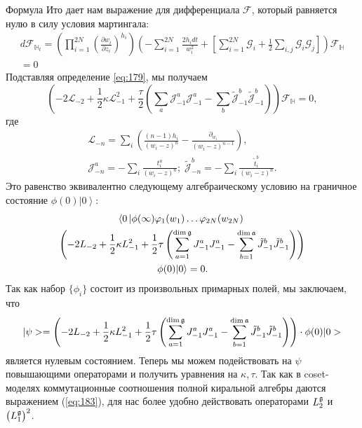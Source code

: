 Формула Ито дает нам выражение для дифференциала $\mathcal{F}$, который равняется нулю в силу условия мартингала:
\begin{multline}
d \mathcal{F}_{\mathbb{H}_{t}}= \left(\prod_{i=1}^{2N}\left(\frac{\partial w_{i}}{\partial z_{i}}\right)^{h_{i}}\right)
\left(-\sum_{i=1}^{2N}\frac{2h_{i}dt}{w_{i}^{2}}+\left[\sum_{i=1}^{2N}\mathcal{G}_{i}+\frac{1}{2}
      \sum_{i,j}\mathcal{G}_{i}\mathcal{G}_{j}\right]\right)\mathcal{F}_{\mathbb{H}}\\=0
\label{eq:180}
\end{multline}
Подставляя определение \eqref{eq:179}, мы получаем
\begin{equation}
  \left(-2 \mathcal{L}_{-2}+\frac{1}{2}\kappa \mathcal{L}_{-1}^{2}+\frac{\tau}{2}\left( \sum_{a} \mathcal{J}^{a}_{-1} \mathcal{J}^{a}_{-1}-
      \sum_{b}\tilde{\mathcal{J}}^{b}_{-1} \tilde{\mathcal{J}}^{b}_{-1}\right)\right)        \mathcal{F}_{\mathbb{H}}=0,
\label{eq:181}
\end{equation}
где
\begin{eqnarray*}
  \mathcal{L}_{-n}=\sum_{i}\left(\frac{(n-1)h_{i}}{(w_{i}-z)^{n}}-\frac{\partial_{w_{i}}}{(w_{i}-z)^{n-1}}\right),\\ \mathcal{J}^{a}_{{-n}}=-\sum_{i}\frac{t^{a}_{i}}{(w_{i}-z)^{n}};\; \tilde{\mathcal{J}}^{b}_{{-n}}=-\sum_{i}\frac{\tilde{t}^{b}_{i}}{(w_{i}-z)^{n}}.
\end{eqnarray*}
Это равенство эквивалентно следующему алгебраическому условию на граничное состояние $\phi(0)\left|0\right>$:
\begin{multline}
\label{eq:182}
  \left<0\left|\phi(\infty)\varphi_{1}(w_{1})\dots\varphi_{2N}(w_{2N})\right.\right.\\
  \left(-2L_{-2}+\frac{1}{2}\kappa L_{-1}^{2}+\frac{1}{2}\tau \left(\sum_{a=1}^{\dim\mathfrak{g}}J^{a}_{-1}J^{a}_{-1}-\sum_{b=1}^{\dim\mathfrak{a}}\tilde{J}^{b}_{-1}\tilde{J}^{b}_{-1}\right)\right)\\
\left.\phi(0)|0\right>=0.
\end{multline}
Так как набор  $\{\phi_{i}\}$ состоит из произвольных примарных полей, мы заключаем, что 
\begin{multline}
\label{eq:126}
|\psi>=\left(-2L_{-2}+\frac{1}{2}\kappa L_{-1}^{2}+\frac{1}{2}\tau \left(\sum_{a=1}^{\dim\mathfrak{g}}J^{a}_{-1}J^{a}_{-1}-\sum_{b=1}^{\dim\mathfrak{a}}\tilde{J}^{b}_{-1}\tilde{J}^{b}_{-1}\right)\right)
\cdot\phi(0)|0>
\end{multline}
является нулевым состоянием. Теперь мы можем подействовать на  $\psi$ повышающими операторами и получить уравнения на  $\kappa,\tau$. Так как в  coset-моделях коммутационные соотношения полной киральной алгебры даются выражением (\ref{eq:183}), для нас более удобно действовать операторами $L_{2}^{\mathfrak{g}}$ и $\left(L_{1}^{\mathfrak{g}}\right)^{2}$. 
